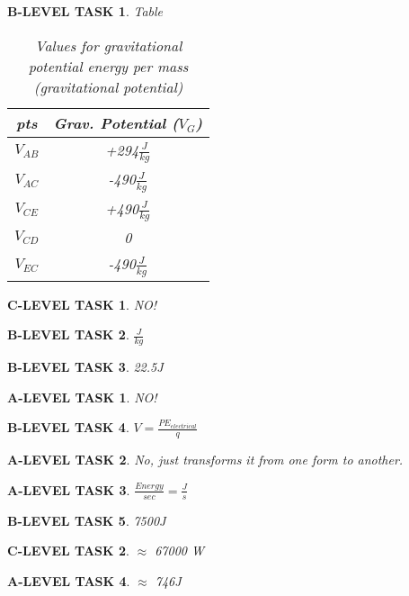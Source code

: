 \documentclass{book}
\numberwithin{equation}{section}
\newtheorem{alevel}{A-LEVEL TASK}
\newtheorem{blevel}{B-LEVEL TASK}
\newtheorem{clevel}{C-LEVEL TASK}
\theoremstyle{definition}
\begin{document}
\begin{blevel} Table\par
\begin{table}[H]
\begin{center}
\begin{tabular}{|c|c|}\hline
pts&Grav. Potential ($V_G$)\\ \hline
$V_{AB}$& +294$\frac{J}{kg}$\\ \hline
$V_{AC}$& -490$\frac{J}{kg}$\\ \hline
$V_{CE}$& +490$\frac{J}{kg}$\\ \hline
$V_{CD}$& 0\\ \hline
$V_{EC}$& -490$\frac{J}{kg}$\\ \hline
\end{tabular}
\caption{Values for gravitational potential energy per mass (gravitational potential)}
\label{T:2GP}
\end{center}
\end{table}
\end{blevel}

\begin{clevel}NO!\end{clevel}
\begin{blevel}$\frac{J}{kg}$\end{blevel}
\begin{blevel}22.5J\end{blevel}
\begin{alevel}NO!\end{alevel}
\begin{blevel}$V=\frac{PE_{electrical}}{q}$\end{blevel}


\begin{alevel}No, just transforms it from one form to another.\end{alevel}
\begin{alevel}$\frac{Energy}{sec}=\frac{J}{s}$\end{alevel}
\begin{blevel}7500J\end{blevel}
\begin{clevel}$\approx$ 67000 W\end{clevel}
\begin{alevel}$\approx$ 746J\end{alevel}
\end{document}
